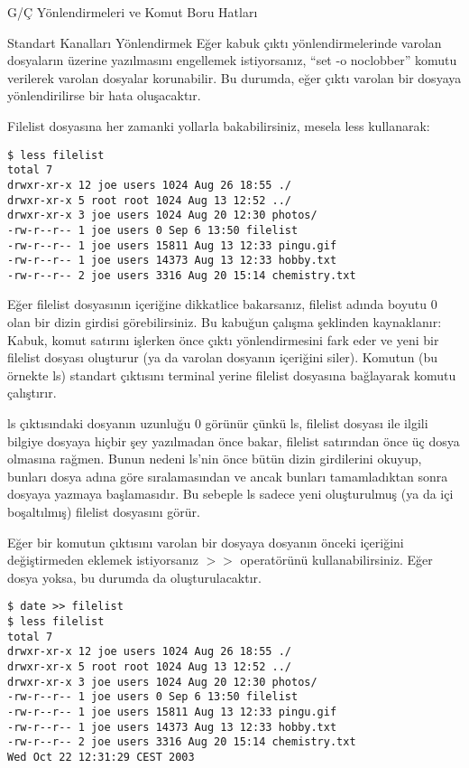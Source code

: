 \begin{section}{G/Ç Yönlendirmeleri ve Komut Boru Hatları}
\begin{subsection}{Standart Kanalları Yönlendirmek}
Eğer kabuk çıktı yönlendirmelerinde varolan dosyaların üzerine yazılmasını engellemek istiyorsanız, “set -o noclobber” komutu verilerek varolan dosyalar korunabilir. Bu durumda, eğer çıktı varolan bir dosyaya yönlendirilirse bir hata oluşacaktır.

Filelist dosyasına her zamanki yollarla bakabilirsiniz, mesela less kullanarak:
\footnotesize
\begin{verbatim}
$ less filelist
total 7 
drwxr-xr-x 12 joe users 1024 Aug 26 18:55 ./
drwxr-xr-x 5 root root 1024 Aug 13 12:52 ../
drwxr-xr-x 3 joe users 1024 Aug 20 12:30 photos/
-rw-r--r-- 1 joe users 0 Sep 6 13:50 filelist
-rw-r--r-- 1 joe users 15811 Aug 13 12:33 pingu.gif
-rw-r--r-- 1 joe users 14373 Aug 13 12:33 hobby.txt
-rw-r--r-- 2 joe users 3316 Aug 20 15:14 chemistry.txt
\end{verbatim}
\normalsize

Eğer filelist dosyasının içeriğine dikkatlice bakarsanız, filelist adında boyutu 0 olan bir dizin girdisi görebilirsiniz. Bu kabuğun çalışma şeklinden kaynaklanır: Kabuk, komut satırını işlerken önce çıktı yönlendirmesini fark eder ve yeni bir filelist dosyası oluşturur (ya da varolan dosyanın içeriğini siler). Komutun (bu örnekte ls) standart çıktısını terminal yerine filelist dosyasına bağlayarak komutu çalıştırır.

ls çıktısındaki dosyanın uzunluğu 0 görünür çünkü ls, filelist dosyası ile ilgili bilgiye dosyaya hiçbir şey yazılmadan önce bakar, filelist satırından önce üç dosya olmasına rağmen. Bunun nedeni ls'nin önce bütün dizin girdilerini okuyup, bunları dosya adına göre sıralamasından ve ancak bunları tamamladıktan sonra dosyaya yazmaya başlamasıdır. Bu sebeple ls sadece yeni oluşturulmuş (ya da içi boşaltılmış) filelist dosyasını görür.

Eğer bir komutun çıktısını varolan bir dosyaya dosyanın önceki içeriğini değiştirmeden eklemek istiyorsanız $>>$ operatörünü kullanabilirsiniz. Eğer dosya yoksa, bu durumda da oluşturulacaktır.

\footnotesize
\begin{verbatim}
$ date >> filelist
$ less filelist
total 7
drwxr-xr-x 12 joe users 1024 Aug 26 18:55 ./
drwxr-xr-x 5 root root 1024 Aug 13 12:52 ../
drwxr-xr-x 3 joe users 1024 Aug 20 12:30 photos/
-rw-r--r-- 1 joe users 0 Sep 6 13:50 filelist
-rw-r--r-- 1 joe users 15811 Aug 13 12:33 pingu.gif
-rw-r--r-- 1 joe users 14373 Aug 13 12:33 hobby.txt
-rw-r--r-- 2 joe users 3316 Aug 20 15:14 chemistry.txt
Wed Oct 22 12:31:29 CEST 2003
\end{verbatim}
\normalsize


\end{subsection}
\end{section}
